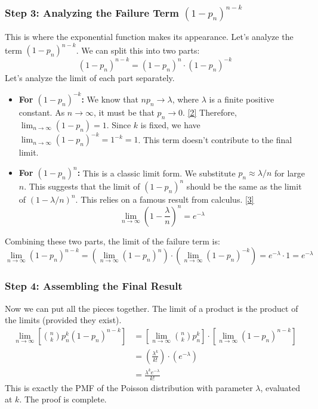 \documentclass[11pt,a4paper]{article}
\begin{document}
\subsubsection{Step 3: Analyzing the Failure Term $(1-p_n)^{n-k}$}
This is where the exponential function makes its appearance. Let's analyze the term $(1-p_n)^{n-k}$. We can split this into two parts:
\[
(1-p_n)^{n-k} = (1-p_n)^n \cdot (1-p_n)^{-k}
\]
Let's analyze the limit of each part separately.
\begin{itemize}
    \item \textbf{For $(1-p_n)^{-k}$:} We know that $np_n \to \lambda$, where $\lambda$ is a finite positive constant. As $n \to \infty$, it must be that $p_n \to 0$. \hyperref[note:pn_to_zero]{[2]}
    Therefore, $\lim_{n \to \infty} (1-p_n) = 1$. Since $k$ is fixed, we have $\lim_{n \to \infty} (1-p_n)^{-k} = 1^{-k} = 1$. This term doesn't contribute to the final limit.

    \item \textbf{For $(1-p_n)^n$:} This is a classic limit form. We substitute $p_n \approx \lambda/n$ for large $n$. This suggests that the limit of $(1-p_n)^n$ should be the same as the limit of $(1 - \lambda/n)^n$. This relies on a famous result from calculus. \hyperref[note:exp_limit]{[3]}
    \[
    \lim_{n \to \infty} \left(1 - \frac{\lambda}{n}\right)^n = e^{-\lambda}
    \]
\end{itemize}
Combining these two parts, the limit of the failure term is:
\[
\lim_{n \to \infty} (1-p_n)^{n-k} = \left(\lim_{n \to \infty} (1-p_n)^n\right) \cdot \left(\lim_{n \to \infty} (1-p_n)^{-k}\right) = e^{-\lambda} \cdot 1 = e^{-\lambda}
\]

\subsubsection{Step 4: Assembling the Final Result}
Now we can put all the pieces together. The limit of a product is the product of the limits (provided they exist).
\begin{align*}
\lim_{n \to \infty} \left[ \binom{n}{k} p_n^k (1-p_n)^{n-k} \right] &= \left[ \lim_{n \to \infty} \binom{n}{k} p_n^k \right] \cdot \left[ \lim_{n \to \infty} (1-p_n)^{n-k} \right] \\
&= \left( \frac{\lambda^k}{k!} \right) \cdot \left( e^{-\lambda} \right) \\
&= \frac{\lambda^k e^{-\lambda}}{k!}
\end{align*}
This is exactly the PMF of the Poisson distribution with parameter $\lambda$, evaluated at $k$. The proof is complete.
\end{document}
